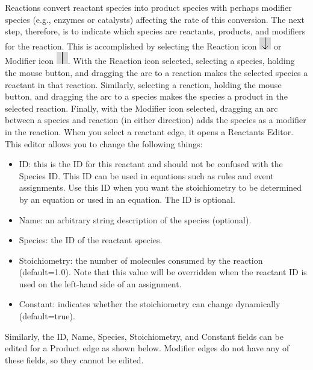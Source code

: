 \documentclass[titlepage,11pt]{article}
\begin{document}
Reactions convert reactant species into product species with perhaps modifier species (e.g., enzymes or catalysts) affecting the rate of this conversion.  The next step, therefore, is to indicate which species are reactants, products, and modifiers for the reaction.  This is accomplished by selecting the Reaction icon \includegraphics{../gui/icons/modelview/reaction_selected} or Modifier icon \includegraphics{../gui/icons/modelview/modifier_selected}.  With the Reaction icon selected, selecting a species, holding the mouse button, and dragging the arc to a reaction makes the selected species a reactant in that reaction.  Similarly, selecting a reaction, holding the mouse button, and dragging the arc to a species makes the species a product in the selected reaction.  Finally, with the Modifier icon selected, dragging an arc between a species and reaction (in either direction) adds the species as a modifier in the reaction.  When you select a reactant edge, it opens a Reactants Editor.  This editor allows you to change the following things:
\begin{itemize}
\item ID: this is the ID for this reactant and should not be confused with the Species ID.  This ID can be used in equations such as rules and event assignments.  Use this ID when you want the stoichiometry to be determined by an equation or used in an equation.  The ID is optional.
\item Name: an arbitrary string description of the species (optional).
\item Species: the ID of the reactant species.
\item Stoichiometry: the number of molecules consumed by the reaction (default=1.0).  Note that this value will be overridden when the reactant ID is used on the left-hand side of an assignment.
\item Constant: indicates whether the stoichiometry can change dynamically (default=true).  
\end{itemize}
Similarly, the ID, Name, Species, Stoichiometry, and Constant fields can be edited for a Product edge as shown below.  Modifier edges do not have any of these fields, so they cannot be edited.
\end{document}
